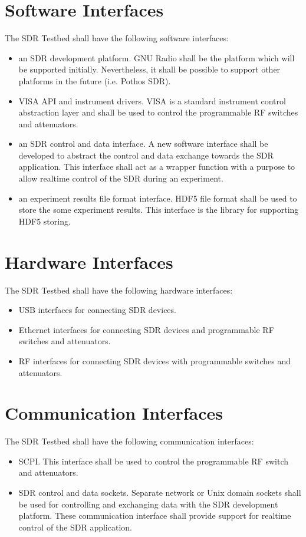 \documentclass[english,titlepage,a4paper]{report}
\begin{document}
\section{Software Interfaces}

The SDR Testbed shall have the following software interfaces:
\begin{itemize}
\item an SDR development platform.
  GNU Radio shall be the platform which will be supported initially.
  Nevertheless, it shall be possible to support other platforms in the future (i.e. Pothos SDR).
\item VISA API and instrument drivers.
  VISA is a standard instrument control abstraction layer and shall be used to control the programmable RF switches and attenuators.
\item an SDR control and data interface.
  A new software interface shall be developed to abstract the control and data exchange towards the SDR application.
  This interface shall act as a wrapper function with a purpose to allow realtime control of the SDR during an experiment.
\item an experiment results file format interface.
  HDF5 file format shall be used to store the some experiment results.
  This interface is the library for supporting HDF5 storing.
\end{itemize}

\section{Hardware Interfaces}

The SDR Testbed shall have the following hardware interfaces:
\begin{itemize}
\item USB interfaces for connecting SDR devices.
\item Ethernet interfaces for connecting SDR devices and programmable RF switches and attenuators.
\item RF interfaces for connecting SDR devices with programmable switches and attenuators.
\end{itemize}

\section{Communication Interfaces}

The SDR Testbed shall have the following communication interfaces:
\begin{itemize}
\item SCPI.
  This interface shall be used to control the programmable RF switch and attenuators.
\item SDR control and data sockets.
  Separate network or Unix domain sockets shall be used for controlling and exchanging data with the SDR development platform.
  These communication interface shall provide support for realtime control of the SDR application.
\end{itemize}
\end{document}
